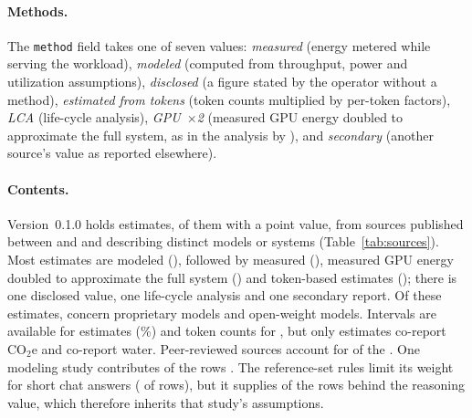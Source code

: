 \documentclass[11pt]{article}
\newcommand{\version}{0.1.0}
\newcommand{\file}[1]{\texttt{#1}}
\begin{document}
\paragraph{Methods.}
The \file{method} field takes one of seven values: \emph{measured} (energy metered while serving the workload), \emph{modeled} (computed from throughput, power and utilization assumptions), \emph{disclosed} (a figure stated by the operator without a method), \emph{estimated from tokens} (token counts multiplied by per-token factors), \emph{LCA} (life-cycle analysis), \emph{GPU~$\times$2} (measured GPU energy doubled to approximate the full system, as in the analysis by \citealp{odonnell2025math}), and \emph{secondary} (another source's value as reported elsewhere).

\paragraph{Contents.}
Version~\version{} holds \nEst{} estimates, \nEstEnergy{} of them with a point value, from \nSrcEst{} sources published between \yearMin{} and \yearMax{} and describing \nModels{} distinct models or systems (Table~\ref{tab:sources}). Most estimates are modeled (\nModeled), followed by measured (\nMeasured), measured GPU energy doubled to approximate the full system (\nGpuTwo) and token-based estimates (\nTokenBased); there is one disclosed value, one life-cycle analysis and one secondary report. Of these estimates, \nProprietary{} concern proprietary models and \nOpenWeights{} open-weight models. Intervals are available for \nInterval{} estimates (\pctInterval\%) and token counts for \nTokenRows, but only \nCOtwo{} estimates co-report CO$_2$e and \nWater{} co-report water. Peer-reviewed sources account for \nSrcPeer{} of the \nSrcEst. One modeling study contributes \nJegham{} of the \nEst{} rows \citep{jegham2025hungry}. The reference-set rules limit its weight for short chat answers (\nChatJegham{} of  rows), but it supplies \nReasonJegham{} of the  rows behind the reasoning value, which therefore inherits that study's assumptions.

\begin{table}[t]
  \centering
  \footnotesize
  \caption{Sources that contribute estimates, ordered by number of estimates ($n$). All \nSrcAll{} sources, including those of the context tables, are listed in \file{sources.csv}.}
  \label{tab:sources}
  
\end{table}
\end{document}
